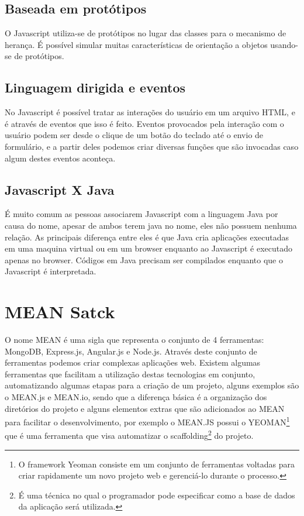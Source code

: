  \subsection{Baseada em protótipos}
 
 O Javascript utiliza-se de protótipos no lugar das classes para o mecanismo de herança. É possível simular muitas características de orientação a objetos usando-se de protótipos.

 \subsection{Linguagem dirigida e eventos}
 
 No Javascript é possível  tratar as interações do usuário em um arquivo HTML, e é através de eventos que isso é feito. Eventos provocados pela interação com o usuário podem ser desde  o clique de um botão do teclado até o envio de formulário, e a partir deles podemos criar diversas funções que são invocadas caso algum destes eventos aconteça.

 \subsection{Javascript X Java}

É muito comum as pessoas associarem Javascript com a linguagem Java por causa do nome, apesar de ambos terem java no nome, eles não possuem nenhuma relação. As principais diferença entre eles é que Java cria aplicações executadas em uma maquina virtual ou em um browser enquanto ao Javascript é executado apenas no browser. Códigos em Java precisam ser compilados enquanto que o Javascript é interpretada.


\section{MEAN Satck}
O nome MEAN é uma sigla que representa o conjunto de 4 ferramentas: MongoDB, Express.js, Angular.js e Node.js. Através deste conjunto de ferramentas podemos criar complexas aplicações web.
Existem algumas ferramentas que facilitam a utilização destas tecnologias em conjunto, automatizando algumas etapas para a criação de um projeto, alguns exemplos são o MEAN.js e MEAN.io, sendo que a diferença básica é a organização dos diretórios do projeto e alguns elementos extras que são adicionados ao MEAN para facilitar o desenvolvimento, por exemplo o MEAN.JS possui o YEOMAN\footnote{ O framework Yeoman consiste em um conjunto de ferramentas voltadas para criar rapidamente um novo projeto web e gerenciá-lo durante o processo.} que é uma ferramenta que visa automatizar o scaffolding\footnote{É uma técnica no qual o programador pode especificar como a base de dados da aplicação será utilizada.} do projeto. 


